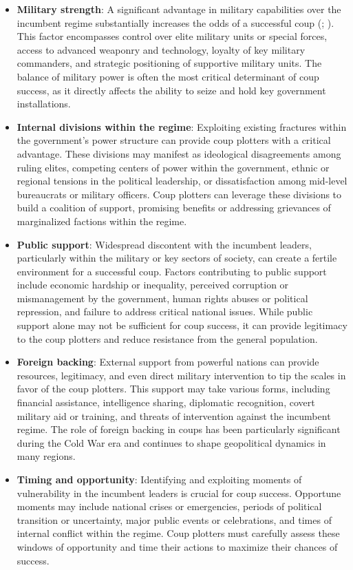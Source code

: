 \documentclass[
  12pt,
]{report}
\begin{document}
\begin{itemize}
\item
  \textbf{Military strength}: A significant advantage in military
  capabilities over the incumbent regime substantially increases the
  odds of a successful coup (; ). This factor
  encompasses control over elite military units or special forces,
  access to advanced weaponry and technology, loyalty of key military
  commanders, and strategic positioning of supportive military units.
  The balance of military power is often the most critical determinant
  of coup success, as it directly affects the ability to seize and hold
  key government installations.
\item
  \textbf{Internal divisions within the regime}: Exploiting existing
  fractures within the government's power structure can provide coup
  plotters with a critical advantage. These divisions may manifest as
  ideological disagreements among ruling elites, competing centers of
  power within the government, ethnic or regional tensions in the
  political leadership, or dissatisfaction among mid-level bureaucrats
  or military officers. Coup plotters can leverage these divisions to
  build a coalition of support, promising benefits or addressing
  grievances of marginalized factions within the regime.
\item
  \textbf{Public support}: Widespread discontent with the incumbent
  leaders, particularly within the military or key sectors of society,
  can create a fertile environment for a successful coup. Factors
  contributing to public support include economic hardship or
  inequality, perceived corruption or mismanagement by the government,
  human rights abuses or political repression, and failure to address
  critical national issues. While public support alone may not be
  sufficient for coup success, it can provide legitimacy to the coup
  plotters and reduce resistance from the general population.
\item
  \textbf{Foreign backing}: External support from powerful nations can
  provide resources, legitimacy, and even direct military intervention
  to tip the scales in favor of the coup plotters. This support may take
  various forms, including financial assistance, intelligence sharing,
  diplomatic recognition, covert military aid or training, and threats
  of intervention against the incumbent regime. The role of foreign
  backing in coups has been particularly significant during the Cold War
  era and continues to shape geopolitical dynamics in many regions.
\item
  \textbf{Timing and opportunity}: Identifying and exploiting moments of
  vulnerability in the incumbent leaders is crucial for coup success.
  Opportune moments may include national crises or emergencies, periods
  of political transition or uncertainty, major public events or
  celebrations, and times of internal conflict within the regime. Coup
  plotters must carefully assess these windows of opportunity and time
  their actions to maximize their chances of success.
\end{itemize}
\end{document}
